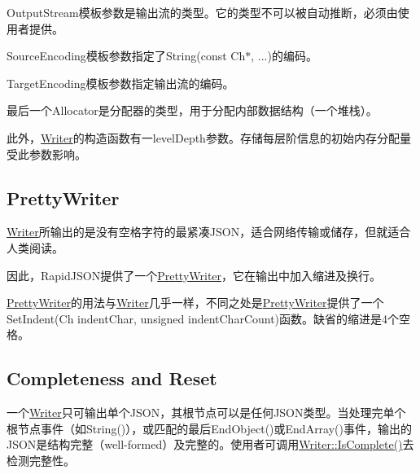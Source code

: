 {\ttfamily Output\+Stream}模板参数是输出流的类型。它的类型不可以被自动推断，必须由使用者提供。

{\ttfamily Source\+Encoding}模板参数指定了{\ttfamily String(const Ch$\ast$, ...)}的编码。

{\ttfamily Target\+Encoding}模板参数指定输出流的编码。

最后一个{\ttfamily Allocator}是分配器的类型，用于分配内部数据结构（一个堆栈）。

此外，{\ttfamily \hyperlink{class_writer}{Writer}}的构造函数有一{\ttfamily level\+Depth}参数。存储每层阶信息的初始内存分配量受此参数影响。\hypertarget{md_Commun_Externe_RapidJSON_doc_sax.zh-cn_PrettyWriter}{}\subsection{Pretty\+Writer}\label{md_Commun_Externe_RapidJSON_doc_sax.zh-cn_PrettyWriter}
{\ttfamily \hyperlink{class_writer}{Writer}}所输出的是没有空格字符的最紧凑\+J\+S\+O\+N，适合网络传输或储存，但就适合人类阅读。

因此，\+Rapid\+J\+S\+O\+N提供了一个{\ttfamily \hyperlink{class_pretty_writer}{Pretty\+Writer}}，它在输出中加入缩进及换行。

{\ttfamily \hyperlink{class_pretty_writer}{Pretty\+Writer}}的用法与{\ttfamily \hyperlink{class_writer}{Writer}}几乎一样，不同之处是{\ttfamily \hyperlink{class_pretty_writer}{Pretty\+Writer}}提供了一个{\ttfamily Set\+Indent(\+Ch indent\+Char, unsigned indent\+Char\+Count)}函数。缺省的缩进是4个空格。\hypertarget{md_Commun_Externe_RapidJSON_doc_sax.zh-cn_CompletenessReset}{}\subsection{Completeness and Reset}\label{md_Commun_Externe_RapidJSON_doc_sax.zh-cn_CompletenessReset}
一个{\ttfamily \hyperlink{class_writer}{Writer}}只可输出单个\+J\+S\+O\+N，其根节点可以是任何\+J\+S\+O\+N类型。当处理完单个根节点事件（如{\ttfamily String()}），或匹配的最后{\ttfamily End\+Object()}或{\ttfamily End\+Array()}事件，输出的\+J\+S\+O\+N是结构完整（well-\/formed）及完整的。使用者可调用{\ttfamily \hyperlink{class_writer_aced42429d1b31a565c5ca0310bf4e276}{Writer\+::\+Is\+Complete()}}去检测完整性。

